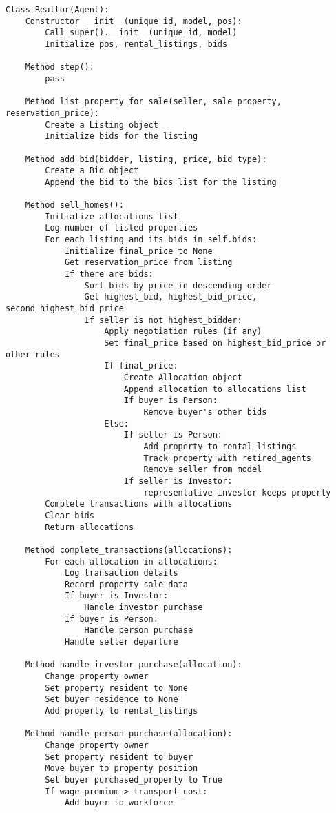 {\begin{verbatim}
Class Realtor(Agent):
    Constructor __init__(unique_id, model, pos):
        Call super().__init__(unique_id, model)
        Initialize pos, rental_listings, bids

    Method step():
        pass

    Method list_property_for_sale(seller, sale_property, reservation_price):
        Create a Listing object
        Initialize bids for the listing

    Method add_bid(bidder, listing, price, bid_type):
        Create a Bid object
        Append the bid to the bids list for the listing

    Method sell_homes():
        Initialize allocations list
        Log number of listed properties
        For each listing and its bids in self.bids:
            Initialize final_price to None
            Get reservation_price from listing
            If there are bids:
                Sort bids by price in descending order
                Get highest_bid, highest_bid_price, second_highest_bid_price
                If seller is not highest_bidder:
                    Apply negotiation rules (if any)
                    Set final_price based on highest_bid_price or other rules
                    If final_price:
                        Create Allocation object
                        Append allocation to allocations list
                        If buyer is Person:
                            Remove buyer's other bids
                    Else:
                        If seller is Person:
                            Add property to rental_listings
                            Track property with retired_agents
                            Remove seller from model
                        If seller is Investor:
                            representative investor keeps property
        Complete transactions with allocations
        Clear bids
        Return allocations

    Method complete_transactions(allocations):
        For each allocation in allocations:
            Log transaction details
            Record property sale data
            If buyer is Investor:
                Handle investor purchase
            If buyer is Person:
                Handle person purchase
            Handle seller departure

    Method handle_investor_purchase(allocation):
        Change property owner
        Set property resident to None
        Set buyer residence to None
        Add property to rental_listings

    Method handle_person_purchase(allocation):
        Change property owner
        Set property resident to buyer
        Move buyer to property position
        Set buyer purchased_property to True
        If wage_premium > transport_cost:
            Add buyer to workforce


\end{verbatim}}
